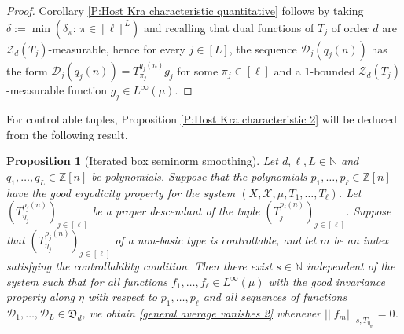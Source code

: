 \documentclass[11pt]{amsart}
\newtheorem{proposition}[lemma]{Proposition}
\theoremstyle{definition}
\newcommand{\N}{{\mathbb N}}
\newcommand{\Z}{{\mathbb Z}}
\newcommand{\CD}{{\mathcal D}}
\newcommand{\CX}{{\mathcal X}}
\newcommand{\CZ}{{\mathcal Z}}
\newcommand{\FD}{{\mathfrak D}}
\newcommand{\FI}{{\mathfrak I}}
\newcommand{\nnorm}[1]{\lvert\!|\!| #1|\!|\!\rvert}
\DeclareMathOperator{\supp}{Supp}
\newcommand{\brac}[1]{\mathopen{}\left( #1 \mathclose{}\right)}
\begin{document}
\begin{proof}
	Corollary \ref{P:Host Kra characteristic quantitative} follows by taking
	$\delta:= \min(\delta_\pi\colon \, \pi\in[\ell]^L)$ and recalling that dual functions of $T_j$ of order $d$ are $\CZ_d(T_j)$-measurable, hence for every $j\in[L]$, the sequence $\CD_{j}(q_j(n))$ has the form $\CD_j(q_j(n)) = T_{\pi_j}^{q_j(n)}g_j$ for some $\pi_j\in[\ell]$ and a 1-bounded $\CZ_d(T_j)$-measurable  function $g_j\in L^\infty(\mu)$.
\end{proof}

For controllable tuples, Proposition \ref{P:Host Kra characteristic 2} will be deduced from the following result.
\begin{proposition}[Iterated box seminorm smoothing]\label{P:iterated smoothing}
    Let $d, \ell, L\in\N$ and $q_1, \ldots, q_L\in\Z[n]$ be polynomials. Suppose that the polynomials $p_1, \ldots, p_\ell\in \Z[n]$ have the good ergodicity property for the system $(X,\CX, \mu,T_1, \ldots, T_\ell)$. Let  $\brac{T_{\eta_{j}}^{\rho_{j}(n)}}_{j\in[\ell]}$ be a proper descendant of the tuple $\brac{T_j^{p_j(n)}}_{j\in[\ell]}$.
    Suppose that $\brac{T_{\eta_{j}}^{\rho_{j}(n)}}_{j\in[\ell]}$ of a non-basic type is controllable, and let $m$ be an index satisfying the controllability condition.
    Then there exist $s\in\N$ independent of the system such that for all functions $f_1, \ldots, f_\ell\in L^\infty(\mu)$ with the good invariance property along $\eta$ with respect to $p_1, \ldots, p_\ell$ and all sequences of functions $\CD_{1}, \ldots, \CD_L\in\FD_d$, we obtain \eqref{general average vanishes 2} whenever $\nnorm{f_m}_{s, T_{\eta_m}} = 0$.
\end{proposition}
\end{document}

